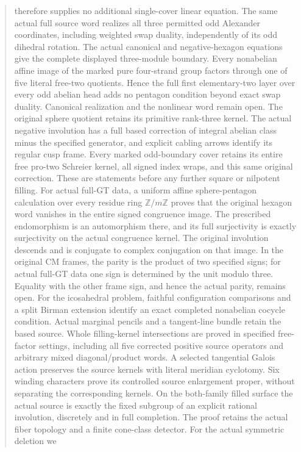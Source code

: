 \documentclass[11pt,a4paper]{article}
\begin{document}
\begin{abstract}
therefore supplies no additional single-cover linear equation. The same actual full
source word realizes all three permitted odd Alexander coordinates,
including weighted swap duality, independently of its odd dihedral
rotation. The actual canonical and negative-hexagon equations give the
complete displayed three-module boundary. Every nonabelian affine
image of the marked pure four-strand group factors through one of five
literal free-two quotients. Hence the full first elementary-two layer
over every odd abelian head adds no pentagon condition beyond exact
swap duality. Canonical realization and the nonlinear word remain open.
The original sphere quotient retains its primitive rank-three kernel.
The actual negative involution has a full based correction of integral
abelian class minus the specified generator, and explicit cabling
arrows identify its regular cusp frame. Every marked odd-boundary
cover retains its entire free pro-two Schreier kernel, all signed
index wraps, and this same original correction. These are statements
before any further square or nilpotent filling.
For actual full-GT data, a uniform affine sphere-pentagon calculation
over every residue ring $\mathbb Z/m\mathbb Z$ proves that the original
hexagon word vanishes in the entire signed
congruence image. The prescribed endomorphism is an automorphism
there, and its full surjectivity is exactly surjectivity on the actual
congruence kernel. The original involution descends and is conjugate
to complex conjugation on that image. In the original CM frames,
the parity is the product of two specified signs; for actual full-GT
data one sign is determined by the unit modulo three. Equality with
the other frame sign, and hence the actual parity, remains open.
For the icosahedral problem, faithful configuration comparisons and a
split Birman extension identify an exact completed nonabelian cocycle
condition. Actual marginal pencils and a tangent-line bundle retain
the based source. Whole filling-kernel intersections are proved in
specified free-factor settings, including all five corrected positive
source operators and arbitrary mixed diagonal/product words. A selected
tangential Galois action preserves the source kernels with literal
meridian cyclotomy. Six winding characters prove its controlled source
enlargement proper, without separating the corresponding kernels.
On the both-family filled surface the actual source is exactly the
fixed subgroup of an explicit rational involution, discretely and in
full completion. The proof retains the actual fiber topology and a
finite cone-class detector. For the actual symmetric deletion we

\end{abstract}
\end{document}

